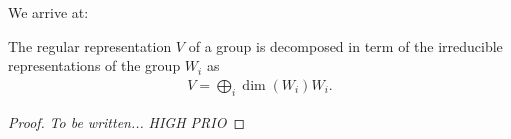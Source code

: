 We arrive at:
\begin{theorem}
	The regular representation $V$ of a group is decomposed in term of the irreducible representations of the group $W_i$ as
	\begin{align*}
		V = \bigoplus_i \dim (W_i) W_i.
	\end{align*}
\end{theorem}

\begin{proof}
	\textit{To be written...} \textit{HIGH PRIO}
\end{proof}

%
%
%
%
%
%	
